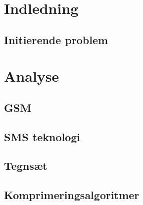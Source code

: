 \documentclass[12pt]{report}
\begin{document}
\setcounter{page}{2}

\begin{titlepage}

\thispagestyle{empty}
\end{titlepage}



\tableofcontents
\thispagestyle{empty}

\renewcommand{\chaptername}{Kapitel}

\chapter{Indledning}
\setcounter{page}{3}
	
	\section{Initierende problem}
	

\chapter{Analyse}

    \section{GSM}
    

	\section{SMS teknologi}
	
	
	\section{Tegnsæt}
	
	
	\section{Komprimeringsalgoritmer}
	
	
\end{document}
